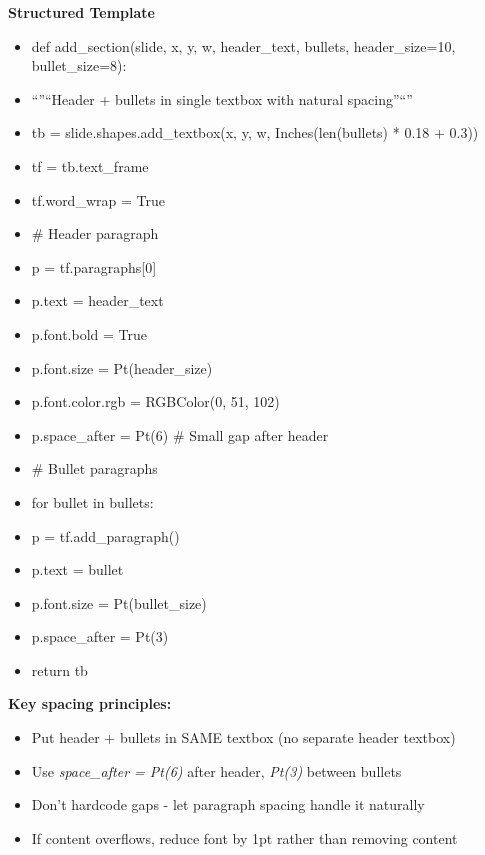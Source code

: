 \documentclass[11pt]{article}
\begin{document}
\textbf{Structured Template}
\begin{itemize}[leftmargin=*,itemsep=2pt,topsep=2pt]
\item {} def add\_\allowbreak{}section(slide, x, y, w, header\_\allowbreak{}text, bullets, header\_\allowbreak{}size=10, bullet\_\allowbreak{}size=8):
\item {} ``''``Header + bullets in single textbox with natural spacing''``''
\item {} tb = slide.shapes.add\_\allowbreak{}textbox(x, y, w, Inches(len(bullets) * 0.18 + 0.3))
\item {} tf = tb.text\_\allowbreak{}frame
\item {} tf.word\_\allowbreak{}wrap = True
\item {} \# Header paragraph
\item {} p = tf.paragraphs[0]
\item {} p.text = header\_\allowbreak{}text
\item {} p.font.bold = True
\item {} p.font.size = Pt(header\_\allowbreak{}size)
\item {} p.font.color.rgb = RGBColor(0, 51, 102)
\item {} p.space\_\allowbreak{}after = Pt(6) \# Small gap after header
\item {} \# Bullet paragraphs
\item {} for bullet in bullets:
\item {} p = tf.add\_\allowbreak{}paragraph()
\item {} p.text = bullet
\item {} p.font.size = Pt(bullet\_\allowbreak{}size)
\item {} p.space\_\allowbreak{}after = Pt(3)
\item {} return tb
\end{itemize}

\textbf{Key spacing principles:}

\begin{itemize}[leftmargin=*,itemsep=2pt,topsep=2pt]
\item {} Put header + bullets in SAME textbox (no separate header textbox)
\item {} Use \emph{space\_\allowbreak{}after = Pt(6)} after header, \emph{Pt(3)} between bullets
\item {} Don't hardcode gaps - let paragraph spacing handle it naturally
\item {} If content overflows, reduce font by 1pt rather than removing content
\end{itemize}
\end{document}
